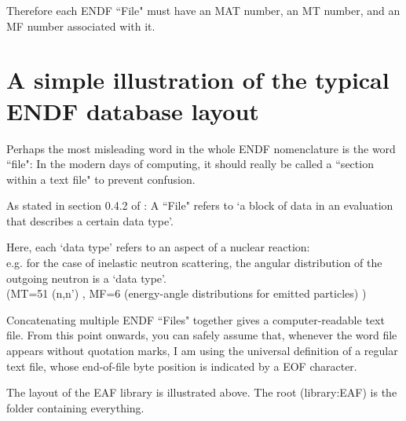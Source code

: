 \documentclass[a4paper, 12pt]{article}
\newcommand{\ve}[1]{\boldsymbol{#1}}
\begin{document}
Therefore each ENDF ``File" must have an MAT number, an MT number, and an MF number associated with it.

\section{A simple illustration of the typical ENDF database layout}
Perhaps the most misleading word in the whole ENDF nomenclature is the word ``file": In the modern days of computing, it should really be called a ``section within a text file" to prevent confusion.

As stated in section 0.4.2 of \cite{ENDFmanual}: A ``File" refers to `a block of data in an evaluation that describes a certain data type'.

Here, each `data type' refers to an aspect of a nuclear reaction:\\e.g. for the case of inelastic neutron scattering, the angular distribution of the outgoing neutron is a `data type'.
\\(MT=51
(n,n')
, MF=6
(energy-angle distributions for emitted particles)
) 

Concatenating multiple ENDF ``Files" together gives a computer-readable text file. From this point onwards, you can safely assume that, whenever the word file appears without quotation marks, I am using the universal definition of a regular text file, whose end-of-file byte position is indicated by a EOF character.

The layout of the EAF library is illustrated above. The root (library:EAF) is the folder containing everything.
\end{document}
